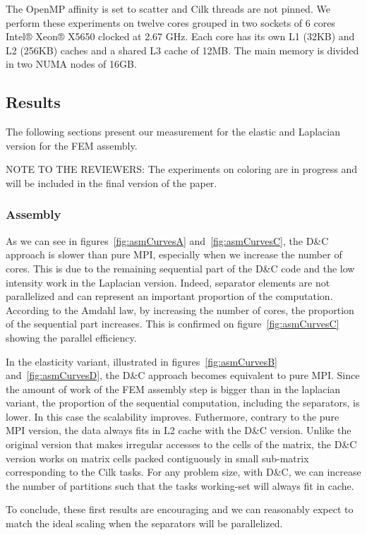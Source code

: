 \documentclass{IOS-Book-Article}
\begin{document}
The OpenMP affinity is set to scatter and Cilk threads are not pinned.
We perform these experiments on twelve cores grouped in two sockets of 6 cores Intel® Xeon® X5650 clocked at 2.67 GHz.
Each core has its own L1 (32KB) and L2 (256KB) caches and a shared L3 cache of 12MB. The main memory is divided in two NUMA nodes of 16GB.

\subsection{Results}
The following sections present our measurement for the elastic and Laplacian version for the FEM assembly. 

NOTE TO THE REVIEWERS: The experiments on coloring are in progress and will be included in the final version of the paper.

\subsubsection{Assembly}
As we can see in figures~\ref{fig:asmCurvesA} and~\ref{fig:asmCurvesC}, the D\&C approach is slower than pure MPI, especially when we increase the number of cores.
This is due to the remaining sequential part of the D\&C code and the low intensity work in the Laplacian version.
Indeed, separator elements are not parallelized and can represent an important proportion of the computation.
According to the Amdahl law, by increasing the number of cores, the proportion of the sequential part increases. This is confirmed on figure~\ref{fig:asmCurvesC} showing the parallel efficiency.

In the elasticity variant, illustrated in figures~\ref{fig:asmCurvesB} and~\ref{fig:asmCurvesD}, the D\&C approach becomes equivalent to pure MPI.
Since the amount of work of the FEM assembly step is bigger than in the laplacian variant, the proportion of the sequential computation, including the separators, is lower.
In this case the scalability improves. Futhermore, contrary to the pure MPI version, the data always fits in L2 cache with the D\&C version.
Unlike the original version that makes irregular accesses to the cells of the matrix, the D\&C version works on matrix cells packed contiguously in small sub-matrix corresponding to the Cilk tasks.
For any problem size, with D\&C, we can increase the number of partitions such that the tasks working-set will always fit in cache.

To conclude, these first results are encouraging and we can reasonably expect to match the ideal scaling when the separators will be parallelized.
\end{document}
